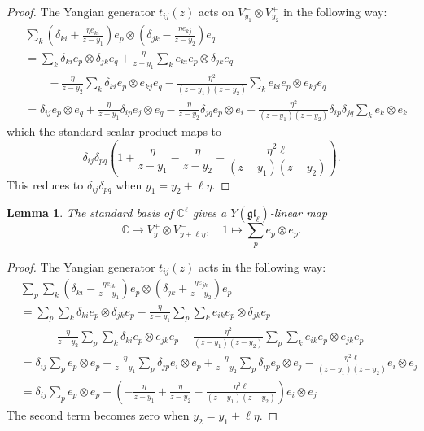 \documentclass[11pt]{report}
\newtheorem{lemma}[theorem]{Lemma}
\theoremstyle{definition}
\theoremstyle{remark}
\theoremstyle{remark}
\newcommand{\C}{\mathbb{C}}
\begin{document}
\begin{proof}
The Yangian generator $t_{ij}(z)$ acts on $V_{y_1}^- \otimes V_{y_2}^+$ in the following way:
\begin{align*}
&\sum_k \left( \delta_{ki}+\frac{\eta e_{ki}}{z-y_1} \right) e_p \otimes \left( \delta_{jk}-\frac{\eta e_{kj}}{z-y_2} \right) e_q \\
&= \sum_k \delta_{ki} e_p \otimes \delta_{jk} e_q + \frac{\eta}{z-y_1} \sum_k e_{ki} e_p \otimes \delta_{jk} e_q \\
& \quad \quad - \frac{\eta}{z-y_2} \sum_k \delta_{ki} e_p \otimes e_{kj} e_q
- \frac{\eta^2}{(z-y_1)(z-y_2)} \sum_k e_{ki} e_p \otimes e_{kj} e_q \\
&= \delta_{ij} e_p \otimes e_q
+ \frac{\eta}{z-y_1} \delta_{ip} e_j \otimes e_q
- \frac{\eta}{z-y_2} \delta_{jq} e_p \otimes e_i
- \frac{\eta^2}{(z-y_1)(z-y_2)} \delta_{ip} \delta_{jq} \sum_k e_k \otimes e_k
\end{align*}
which the standard scalar product maps to
\begin{equation*}
\delta_{ij} \delta_{pq} \left( 1
+ \frac{\eta}{z-y_1}
- \frac{\eta}{z-y_2}
- \frac{\eta^2 \ell}{(z-y_1)(z-y_2)} \right).
\end{equation*}
This reduces to $\delta_{ij} \delta_{pq}$ when $y_1 = y_2+\ell \eta$.
\end{proof}

\begin{lemma}
The standard basis of $\C^\ell$ gives a $Y(\mathfrak{gl}_\ell)$-linear map
\begin{equation*}
\C \to V_y^+ \otimes V_{y+\ell \eta}^-, \quad 1 \mapsto \sum_p e_p \otimes e_p.
\end{equation*}
\end{lemma}

\begin{proof}
The Yangian generator $t_{ij}(z)$ acts in the following way:
\begin{align*}
&\sum_p \sum_k \left( \delta_{ki}-\frac{\eta e_{ik}}{z-y_1} \right) e_p \otimes \left( \delta_{jk}+\frac{\eta e_{jk}}{z-y_2} \right) e_p \\
&= \sum_p \sum_k \delta_{ki} e_p \otimes \delta_{jk} e_p - \frac{\eta}{z-y_1} \sum_p \sum_k e_{ik} e_p \otimes \delta_{jk} e_p \\
& \quad \quad + \frac{\eta}{z-y_2} \sum_p \sum_k \delta_{ki} e_p \otimes e_{jk} e_p
- \frac{\eta^2}{(z-y_1)(z-y_2)} \sum_p \sum_k e_{ik} e_p \otimes e_{jk} e_p \\
&= \delta_{ij} \sum_p e_p \otimes e_p
- \frac{\eta}{z-y_1} \sum_p \delta_{jp} e_i \otimes e_p
+ \frac{\eta}{z-y_2} \sum_p \delta_{ip} e_p \otimes e_j
- \frac{\eta^2 \ell}{(z-y_1)(z-y_2)} e_i \otimes e_j \\
&= \delta_{ij} \sum_p e_p \otimes e_p
+ \left(- \frac{\eta}{z-y_1}
+ \frac{\eta}{z-y_2}
- \frac{\eta^2 \ell}{(z-y_1)(z-y_2)} \right) e_i \otimes e_j
\end{align*}
The second term becomes zero when $y_2 = y_1 + \ell \eta$.
\end{proof}
\end{document}
